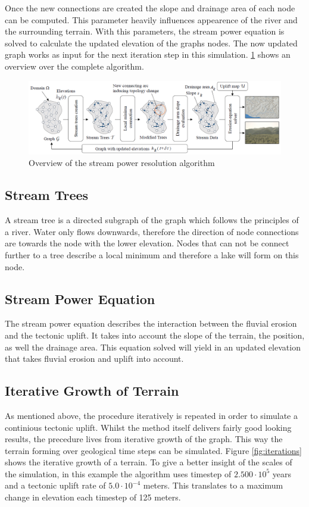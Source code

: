 Once the new connections are created the slope and drainage area of each node can be computed. This parameter heavily influences appearence of the river and the surrounding terrain. With this parameters, the stream power equation\cite{JGRB:JGRB11856} is solved to calculate the updated elevation of the graphs nodes. The now updated graph works as input for the next iteration step in this simulation. 
\ref{fig:stream_power_resolution_algorithm} shows an overview over the complete algorithm. 

\begin{figure}[htb]	
	\centering
	\includegraphics[width=\linewidth]{cordonnier2016large/stream_power_resolution_algorithm}
	\caption{Overview of the stream power resolution algorithm}
	\label{fig:stream_power_resolution_algorithm}
\end{figure}

\subsection{Stream Trees}
A stream tree is a directed subgraph of the graph which follows the principles of a river. Water only flows downwards, therefore the direction of node connections are towards the node with the lower elevation. Nodes that can not be connect further to a tree describe a local minimum and therefore a lake will form on this node. 

\subsection{Stream Power Equation}
The stream power equation describes the interaction between the fluvial erosion and the tectonic uplift. It takes into account the slope of the terrain, the position, as well the drainage area. This equation solved will yield in an updated elevation that takes fluvial erosion and uplift into account. 

\subsection{Iterative Growth of Terrain}
As mentioned above, the procedure iteratively is repeated in order to simulate a continious tectonic uplift. Whilst the method itself delivers fairly good looking results, the precedure lives from iterative growth of the graph. This way the terrain forming over geological time steps can be simulated. Figure \ref{fig:iterations} shows the iterative growth of a terrain. To give a better insight of the scales of the simulation, in this example the algorithm uses timestep of $2.500 \cdot 10^5$ years and a tectonic uplift rate of $5.0 \cdot 10^{-4}$ meters. This translates to a maximum change in elevation each timestep of 125 meters. 

